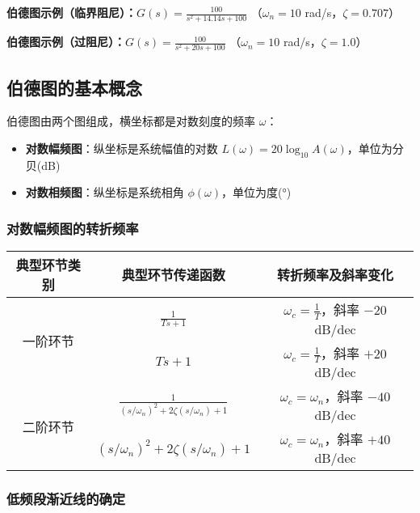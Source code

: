 \textbf{伯德图示例（临界阻尼）：}$G(s) = \frac{100}{s^2 + 14.14s + 100}$ （$\omega_n = 10$ rad/s，$\zeta = 0.707$）
\begin{center}
\end{center}

\textbf{伯德图示例（过阻尼）：}$G(s) = \frac{100}{s^2 + 20s + 100}$ （$\omega_n = 10$ rad/s，$\zeta = 1.0$）
\begin{center}
\end{center}

\subsection{伯德图的基本概念}

伯德图由两个图组成，横坐标都是对数刻度的频率 $\omega$：
\begin{itemize}
    \item \textbf{对数幅频图}：纵坐标是系统幅值的对数 $L(\omega) = 20\log_{10}A(\omega)$，单位为分贝(dB)
    \item \textbf{对数相频图}：纵坐标是系统相角 $\phi(\omega)$，单位为度(°)
\end{itemize}

\subsubsection{对数幅频图的转折频率}

\begin{center}
\begin{tabular}{|c|c|c|}
\hline
\textbf{典型环节类别} & \textbf{典型环节传递函数} & \textbf{转折频率及斜率变化} \\
\hline
\multirow{2}{*}{一阶环节} & $\displaystyle\frac{1}{Ts+1}$ & $\omega_c = \frac{1}{T}$，斜率 $-20$ dB/dec \\
\cline{2-3}
& $Ts+1$ & $\omega_c = \frac{1}{T}$，斜率 $+20$ dB/dec \\
\hline
\multirow{2}{*}{二阶环节} & $\displaystyle\frac{1}{(s/\omega_n)^2+2\zeta(s/\omega_n)+1}$ & $\omega_c = \omega_n$，斜率 $-40$ dB/dec \\
\cline{2-3}
& $(s/\omega_n)^2+2\zeta(s/\omega_n)+1$ & $\omega_c = \omega_n$，斜率 $+40$ dB/dec \\
\hline
\end{tabular}
\end{center}

\subsubsection{低频段渐近线的确定}

